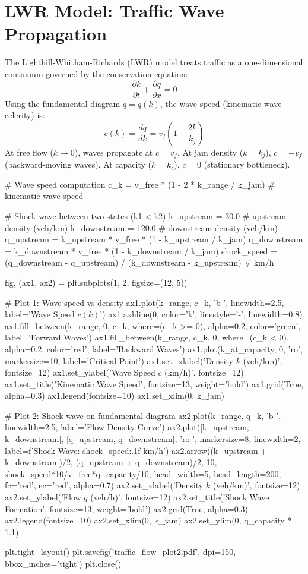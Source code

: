 \documentclass[11pt,a4paper]{article}
\begin{document}
\section{LWR Model: Traffic Wave Propagation}

The Lighthill-Whitham-Richards (LWR) model treats traffic as a one-dimensional continuum governed by the conservation equation:
\begin{equation}
\frac{\partial k}{\partial t} + \frac{\partial q}{\partial x} = 0
\end{equation}
Using the fundamental diagram $q = q(k)$, the wave speed (kinematic wave celerity) is:
\begin{equation}
c(k) = \frac{dq}{dk} = v_f \left(1 - \frac{2k}{k_j}\right)
\end{equation}
At free flow ($k \to 0$), waves propagate at $c = v_f$. At jam density ($k = k_j$), $c = -v_f$ (backward-moving waves). At capacity ($k = k_c$), $c = 0$ (stationary bottleneck).

\begin{pycode}
# Wave speed computation
c_k = v_free * (1 - 2 * k_range / k_jam)  # kinematic wave speed

# Shock wave between two states (k1 < k2)
k_upstream = 30.0  # upstream density (veh/km)
k_downstream = 120.0  # downstream density (veh/km)
q_upstream = k_upstream * v_free * (1 - k_upstream / k_jam)
q_downstream = k_downstream * v_free * (1 - k_downstream / k_jam)
shock_speed = (q_downstream - q_upstream) / (k_downstream - k_upstream)  # km/h

fig, (ax1, ax2) = plt.subplots(1, 2, figsize=(12, 5))

# Plot 1: Wave speed vs density
ax1.plot(k_range, c_k, 'b-', linewidth=2.5, label='Wave Speed $c(k)$')
ax1.axhline(0, color='k', linestyle='-', linewidth=0.8)
ax1.fill_between(k_range, 0, c_k, where=(c_k >= 0), alpha=0.2, color='green', label='Forward Waves')
ax1.fill_between(k_range, c_k, 0, where=(c_k < 0), alpha=0.2, color='red', label='Backward Waves')
ax1.plot(k_at_capacity, 0, 'ro', markersize=10, label='Critical Point')
ax1.set_xlabel('Density $k$ (veh/km)', fontsize=12)
ax1.set_ylabel('Wave Speed $c$ (km/h)', fontsize=12)
ax1.set_title('Kinematic Wave Speed', fontsize=13, weight='bold')
ax1.grid(True, alpha=0.3)
ax1.legend(fontsize=10)
ax1.set_xlim(0, k_jam)

# Plot 2: Shock wave on fundamental diagram
ax2.plot(k_range, q_k, 'b-', linewidth=2.5, label='Flow-Density Curve')
ax2.plot([k_upstream, k_downstream], [q_upstream, q_downstream], 'ro-', markersize=8, linewidth=2, label=f'Shock Wave: {shock_speed:.1f} km/h')
ax2.arrow((k_upstream + k_downstream)/2, (q_upstream + q_downstream)/2, 10, shock_speed*10/v_free*q_capacity/10, head_width=5, head_length=200, fc='red', ec='red', alpha=0.7)
ax2.set_xlabel('Density $k$ (veh/km)', fontsize=12)
ax2.set_ylabel('Flow $q$ (veh/h)', fontsize=12)
ax2.set_title('Shock Wave Formation', fontsize=13, weight='bold')
ax2.grid(True, alpha=0.3)
ax2.legend(fontsize=10)
ax2.set_xlim(0, k_jam)
ax2.set_ylim(0, q_capacity * 1.1)

plt.tight_layout()
plt.savefig('traffic_flow_plot2.pdf', dpi=150, bbox_inches='tight')
plt.close()
\end{pycode}
\end{document}
